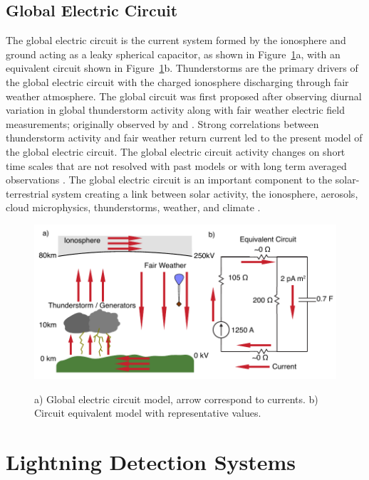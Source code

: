 \subsection{Global Electric Circuit}

The global electric circuit is the current system formed by the ionosphere and ground acting as a leaky spherical capacitor, as shown in Figure~\ref{intro:fig:gec}a, with an equivalent circuit shown in Figure~\ref{intro:fig:gec}b.
Thunderstorms are the primary drivers of the global electric circuit with the charged ionosphere discharging through fair weather atmosphere.
The global circuit was first proposed after observing diurnal variation in global thunderstorm activity along with fair weather electric field measurements; originally observed by \citet{Wilson1921} and \citet{Whipple1929}.
Strong correlations between thunderstorm activity and fair weather return current led to the present model of the global electric circuit.
The global electric circuit activity changes on short time scales that are not resolved with past models or with long term averaged observations \citep{Holzworth1984a}.
The global electric circuit is an important component to the solar-terrestrial system creating a link between solar activity, the ionosphere, aerosols, cloud microphysics, thunderstorms, weather, and climate \citep{Tinsley2007, Holzworth1986}.

\begin{figure}[ht!]
	\centering
	\includegraphics[scale=1]{Introduction/Figures/global_circuit.pdf}\\
	\caption{a) Global electric circuit model, arrow correspond to currents.
			b) Circuit equivalent model with representative values.}
	\label{intro:fig:gec}
\end{figure}

\section{Lightning Detection Systems}

